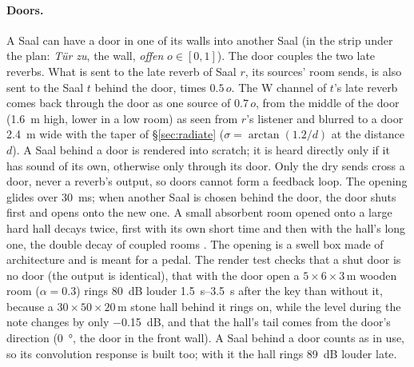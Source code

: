 \documentclass[11pt,a4paper,parskip=half,DIV=11,toc=bibliography]{scrartcl}
\newcommand{\ui}[1]{\emph{#1}}                 %
\begin{document}
\paragraph{Doors.}\label{sec:doors} A Saal can have a door in one of its walls into another Saal (in the strip under the plan:
\ui{Tür zu}, the wall, \ui{offen} $o\in[0,1]$). The door couples the two late reverbs. What is sent to the late reverb of Saal $r$, its
sources' room sends, is also sent to the Saal $t$ behind the door, times $0.5\,o$. The W channel of $t$'s late reverb comes back through
the door as one source of $0.7\,o$, from the middle of the door (\SI{1.6}{m} high, lower in a low room) as seen from $r$'s listener and
blurred to a door \SI{2.4}{m} wide with the taper of \S\ref{sec:radiate} ($\sigma = \arctan(1.2/d)$ at the distance $d$). A Saal behind a
door is rendered into scratch; it is heard directly only if it has sound of its own, otherwise only through its door. Only the dry sends
cross a door, never a reverb's output, so doors cannot form a feedback loop. The opening glides over \SI{30}{ms}; when another Saal is
chosen behind the door, the door shuts first and opens onto the new one. A small absorbent room opened onto a large hard hall decays
twice, first with its own short time and then with the hall's long one, the double decay of coupled rooms \citep{kuttruff2016}. The
opening is a swell box made of architecture and is meant for a pedal. The render test checks that a shut door is no door (the output is
identical), that with the door open a $5\times6\times3$\,m wooden room ($\alpha=0.3$) rings \SI{80}{dB} louder \SIrange{1.5}{3.5}{s} after the
key than without it, because a $30\times50\times20$\,m stone hall behind it rings on, while the level during the note changes by only
\SI{-0.15}{dB}, and that the hall's tail comes from the door's direction (\SI{0}{\degree}, the door in the front wall). A Saal behind a
door counts as in use, so its convolution response is built too; with it the hall rings \SI{89}{dB} louder late.
\end{document}
